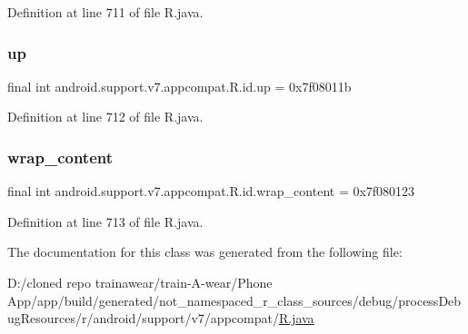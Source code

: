Definition at line 711 of file R.\+java.

\mbox{\label{classandroid_1_1support_1_1v7_1_1appcompat_1_1_r_1_1id_a9aab36bc7e4cb601c12167a3b78ed738}} 
\subsubsection{\texorpdfstring{up}{up}}
{\footnotesize\ttfamily final int android.\+support.\+v7.\+appcompat.\+R.\+id.\+up = 0x7f08011b\hspace{0.3cm}{\ttfamily [static]}}



Definition at line 712 of file R.\+java.

\mbox{\label{classandroid_1_1support_1_1v7_1_1appcompat_1_1_r_1_1id_a5263ea8cbb699c84a7171895a696e0c1}} 
\subsubsection{\texorpdfstring{wrap\_content}{wrap\_content}}
{\footnotesize\ttfamily final int android.\+support.\+v7.\+appcompat.\+R.\+id.\+wrap\+\_\+content = 0x7f080123\hspace{0.3cm}{\ttfamily [static]}}



Definition at line 713 of file R.\+java.



The documentation for this class was generated from the following file\+:\begin{DoxyCompactItemize}
\item 
D\+:/cloned repo trainawear/train-\/\+A-\/wear/\+Phone App/app/build/generated/not\+\_\+namespaced\+\_\+r\+\_\+class\+\_\+sources/debug/process\+Debug\+Resources/r/android/support/v7/appcompat/\mbox{\hyperlink{process_debug_resources_2r_2android_2support_2v7_2appcompat_2_r_8java}{R.\+java}}\end{DoxyCompactItemize}
